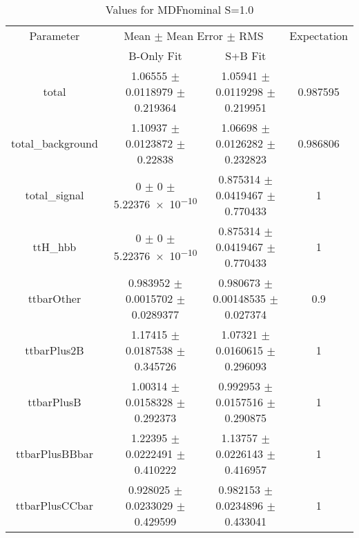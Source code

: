 \begin{table}
\centering
\caption{Values for MDFnominal S=1.0}
\begin{tabular}{cccc}
\toprule
Parameter & \multicolumn{2}{c}{Mean $\pm$ Mean Error $\pm$ RMS} & Expectation\\
 & B-Only Fit & S+B Fit & \\
\midrule
total & \num{1.06555} $\pm$ \num{0.0118979} $\pm$ \num{0.219364} & \num{1.05941} $\pm$ \num{0.0119298} $\pm$ \num{0.219951} & \num{0.987595}\\
total\_background & \num{1.10937} $\pm$ \num{0.0123872} $\pm$ \num{0.22838} & \num{1.06698} $\pm$ \num{0.0126282} $\pm$ \num{0.232823} & \num{0.986806}\\
total\_signal & \num{0} $\pm$ \num{0} $\pm$ \num{5.22376e-10} & \num{0.875314} $\pm$ \num{0.0419467} $\pm$ \num{0.770433} & \num{1}\\
ttH\_hbb & \num{0} $\pm$ \num{0} $\pm$ \num{5.22376e-10} & \num{0.875314} $\pm$ \num{0.0419467} $\pm$ \num{0.770433} & \num{1}\\
ttbarOther & \num{0.983952} $\pm$ \num{0.0015702} $\pm$ \num{0.0289377} & \num{0.980673} $\pm$ \num{0.00148535} $\pm$ \num{0.027374} & \num{0.9}\\
ttbarPlus2B & \num{1.17415} $\pm$ \num{0.0187538} $\pm$ \num{0.345726} & \num{1.07321} $\pm$ \num{0.0160615} $\pm$ \num{0.296093} & \num{1}\\
ttbarPlusB & \num{1.00314} $\pm$ \num{0.0158328} $\pm$ \num{0.292373} & \num{0.992953} $\pm$ \num{0.0157516} $\pm$ \num{0.290875} & \num{1}\\
ttbarPlusBBbar & \num{1.22395} $\pm$ \num{0.0222491} $\pm$ \num{0.410222} & \num{1.13757} $\pm$ \num{0.0226143} $\pm$ \num{0.416957} & \num{1}\\
ttbarPlusCCbar & \num{0.928025} $\pm$ \num{0.0233029} $\pm$ \num{0.429599} & \num{0.982153} $\pm$ \num{0.0234896} $\pm$ \num{0.433041} & \num{1}\\
\bottomrule
\end{tabular}
\end{table}
